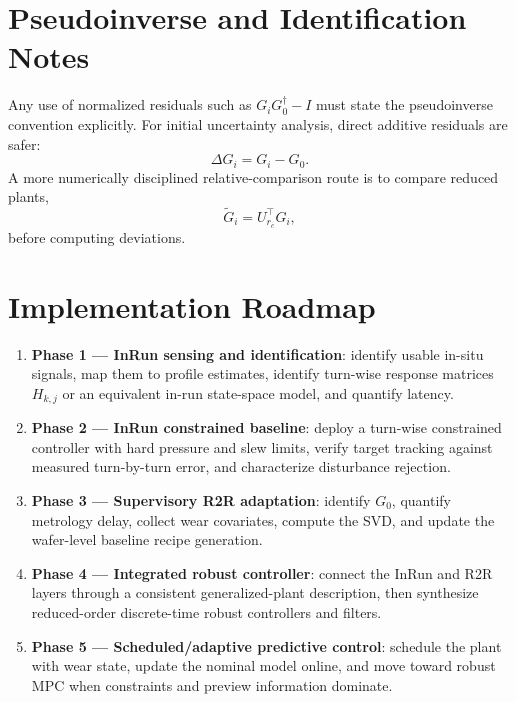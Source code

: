 \documentclass[11pt,a4paper]{article}
\begin{document}
\section{Pseudoinverse and Identification Notes}
Any use of normalized residuals such as $G_iG_0^{\dagger}-I$ must state the pseudoinverse convention explicitly. For initial uncertainty analysis, direct additive residuals are safer:
\[
\Delta G_i=G_i-G_0.
\]
A more numerically disciplined relative-comparison route is to compare reduced plants,
\[
\widetilde G_i=U_{r_c}^\top G_i,
\]
before computing deviations.

\section{Implementation Roadmap}
\begin{enumerate}[leftmargin=1.7em]
\item \textbf{Phase 1 --- InRun sensing and identification}: identify usable in-situ signals, map them to profile estimates, identify turn-wise response matrices $H_{k,j}$ or an equivalent in-run state-space model, and quantify latency.
\item \textbf{Phase 2 --- InRun constrained baseline}: deploy a turn-wise constrained controller with hard pressure and slew limits, verify target tracking against measured turn-by-turn error, and characterize disturbance rejection.
\item \textbf{Phase 3 --- Supervisory R2R adaptation}: identify $G_0$, quantify metrology delay, collect wear covariates, compute the SVD, and update the wafer-level baseline recipe generation.
\item \textbf{Phase 4 --- Integrated robust controller}: connect the InRun and R2R layers through a consistent generalized-plant description, then synthesize reduced-order discrete-time robust controllers and filters.
\item \textbf{Phase 5 --- Scheduled/adaptive predictive control}: schedule the plant with wear state, update the nominal model online, and move toward robust MPC when constraints and preview information dominate.
\end{enumerate}
\end{document}
